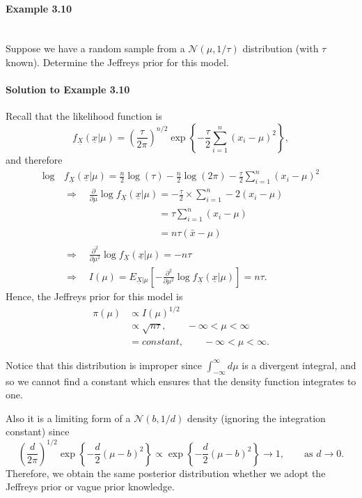 \clearpage

\paragraph{Example 3.10}{~\\
Suppose we have a random sample from a $\mathcal{N}(\mu,1/\tau)$ distribution \label{ex:39} (with $\tau$ known). Determine the Jeffreys prior for this model.

\paragraph{Solution to Example 3.10}{
    
    Recall that the likelihood function is
    $$
    f_{\underline{X}}(\underline{x}|\mu)=
    \left(\frac{\tau}{2\pi}\right)^{n/2}
    \exp\left\{-\frac{\tau}{2}\sum_{i=1}^n (x_i-\mu)^2\right\},
    $$
    and therefore 
    \begin{align*}
    \log\,&f_{\underline{X}}(\underline{x}|\mu)=\frac{n}{2}\log(\tau)-\frac{n}{2}\log(2\pi)
    -\frac{\tau}{2}\sum_{i=1}^n (x_i-\mu)^2 \\
    &\Rightarrow\quad \frac{\partial}{\partial\mu} \log
    f_{\underline{X}}(\underline{x}|\mu)=-\frac{\tau}{2}\times\sum_{i=1}^n -2(x_i-\mu)\\
    &\phantom{\Rightarrow\quad \frac{\partial}{\partial\mu} \log f_{\underline{X}}(\underline{x}|\mu)}
    =\tau\sum_{i=1}^n (x_i-\mu) \\
    &\phantom{\Rightarrow\quad \frac{\partial}{\partial\mu} \log f_{\underline{X}}(\underline{x}|\mu)}
    =n\tau(\bar x-\mu)\\
    &\Rightarrow\quad \frac{\partial^2}{\partial\mu^2} \log
    f_{\underline{X}}(\underline{x}|\mu)=-n\tau\\
    &\Rightarrow\quad I(\mu)=E_{\underline{X}|\mu}
    \left[-\frac{\partial^2}{\partial\mu^2} \log
    f_{\underline{X}}(\underline{x}|\mu)\right]=n\tau.
    \end{align*}
    Hence, the Jeffreys prior for this model is
    \begin{align*}
    \pi(\mu)&\propto I(\mu)^{1/2} \\
    &\propto\sqrt{n\tau},\qquad-\infty<\mu<\infty \\
    &= constant,\qquad-\infty<\mu<\infty. 
    \end{align*}
    
}

Notice that this distribution is improper since $\int_{-\infty}^\infty d\mu$ is a divergent integral, and so we cannot find a constant which ensures that the density function integrates to one.

Also it is a limiting form of a $\mathcal{N}(b,1/d)$ density (ignoring the integration constant) since
\begin{equation*}
\left(\frac{d}{2\pi}\right)^{1/2}\exp\left\{-\frac{d}{2}(\mu-b)^2\right\}
\propto
\exp\left\{-\frac{d}{2}(\mu-b)^2\right\}
\to 1,\quad\quad\text{as }d\to 0.
\end{equation*}
Therefore, we obtain the same posterior distribution whether we adopt
the Jeffreys prior or vague prior knowledge.}

